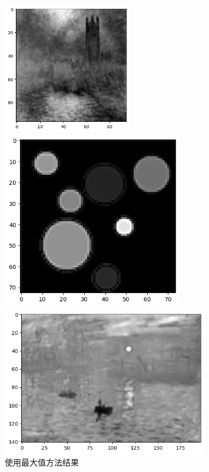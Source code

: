 \documentclass{article}
\begin{document}
\begin{figure}[htbp]
	\centering
		\begin{minipage}[c]{0.3\textwidth} %
			\centering
			\includegraphics[width=0.5\textwidth]{output7.png} %
			
		\end{minipage}%
		\begin{minipage}[c]{0.2\textwidth}
			\centering
			\includegraphics[width=0.7\textwidth]{output8.png}
			
		\end{minipage}
		\begin{minipage}[c]{0.2\textwidth}
			\centering
			\includegraphics[width=0.8\textwidth]{output9.png}
			
		\end{minipage}
		\caption*{使用最大值方法结果}
\end{figure}
\end{document}
